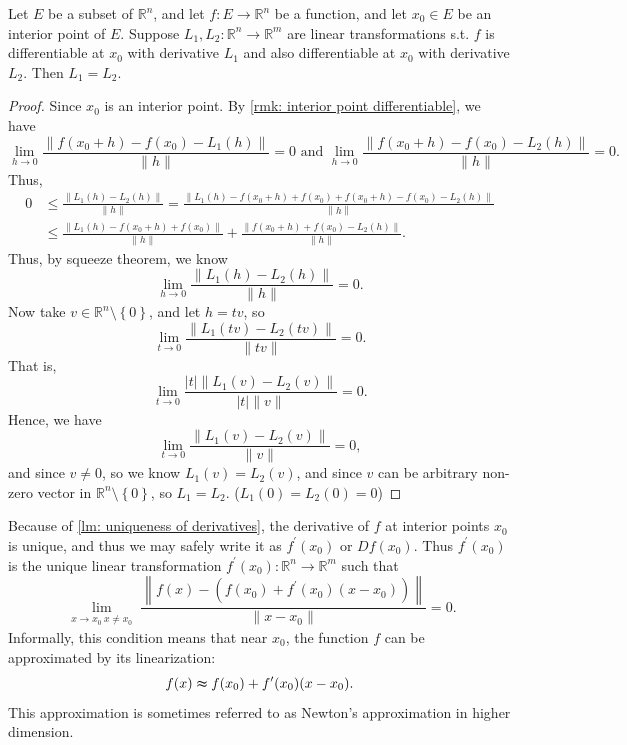 \begin{lemma} \label{lm: uniqueness of derivatives}
    Let \(E\) be a subset of \(\mathbb{R} ^n\), and let \(f: E \to \mathbb{R} ^n\) be a function, and let \(x_0 \in E\) be an interior point of \(E\). Suppose \(L_1, L_2 : \mathbb{R} ^n \to \mathbb{R} ^m\) are linear transformations s.t. \(f\) is differentiable at \(x_0\) with derivative \(L_1\) and also differentiable at \(x_0\) with  derivative \(L_2\). Then \(L_1 = L_2\).           
\end{lemma}
\begin{proof}
    Since \(x_0\) is an interior point. By \autoref{rmk: interior point differentiable}, we have 
    \[
        \lim_{h \to 0} \frac{\left\lVert f(x_0 + h) - f(x_0) - L_1(h) \right\rVert }{\lVert h \rVert } = 0 \text{ and } \lim_{h \to 0} \frac{\left\lVert f(x_0 + h) - f(x_0) - L_2(h) \right\rVert }{\lVert h \rVert } = 0. 
    \]
    Thus, 
    \begin{align*}
        0 &\le \frac{\left\lVert L_1(h) - L_2(h) \right\rVert }{\lVert h \rVert } = \frac{\left\lVert L_1(h) - f(x_0 + h) + f(x_0) + f(x_0 + h) - f(x_0) - L_2(h) \right\rVert }{\left\lVert h \right\rVert } \\
        &\le \frac{\left\lVert L_1(h) - f(x_0 + h) + f(x_0) \right\rVert }{\lVert h \rVert } + \frac{\left\lVert f(x_0 + h) + f(x_0) - L_2(h) \right\rVert }{\lVert h \rVert }.
    \end{align*} 
    Thus, by squeeze theorem, we know 
    \[
        \lim_{h \to 0} \frac{\lVert L_1(h) - L_2(h) \rVert }{\lVert h \rVert } = 0.
    \] 
    Now take \(v \in \mathbb{R} ^n \setminus \left\{ 0 \right\} \), and let \(h = tv\), so 
    \[
        \lim_{t \to 0} \frac{\lVert L_1(tv) - L_2(tv) \rVert }{\lVert tv \rVert } = 0.
    \]  
    That is,
    \[
        \lim_{t \to 0} \frac{\vert t \vert \left\lVert L_1(v) - L_2(v) \right\rVert  }{\vert t \vert \lVert v \rVert  } = 0. 
    \]
    Hence, we have 
    \[
        \lim_{t \to 0} \frac{\left\lVert L_1(v) - L_2(v) \right\rVert }{\lVert v \rVert } = 0, 
    \]
    and since \(v \neq 0\), so we know \(L_1(v) = L_2(v)\), and since \(v\) can be arbitrary non-zero vector in \(\mathbb{R} ^n \setminus \left\{ 0 \right\} \), so \(L_1 = L_2\). (\(L_1(0) = L_2(0) = 0\))     
\end{proof}

\begin{remark}
    Because of \autoref{lm: uniqueness of derivatives}, the derivative of \(f\) at interior points \(x_0\) is unique, and thus we may safely write it as \(f^{\prime} (x_0)\) or \(Df(x_0)\). Thus \(f^{\prime} (x_0)\) is the unique linear transformation \(f^{\prime}(x_0) : \mathbb{R} ^n \to \mathbb{R} ^m\) such that 
    \[
        \lim_{\substack{x \to x_0 \ x \neq x_0}} \frac{\left\lVert f(x) - (f(x_0) + f^{\prime} (x_0) (x - x_0)) \right\rVert }{\lVert x - x_0 \rVert } = 0.
    \]       
    Informally, this condition means that near \(x_0\), the function \(f\) can be approximated by its linearization: 
    \[
        f(x) \thickapprox  f(x_0) + f^{\prime} (x_0) (x - x_0). 
    \]  
    This approximation is sometimes referred to as Newton's approximation in higher dimension.
\end{remark}

